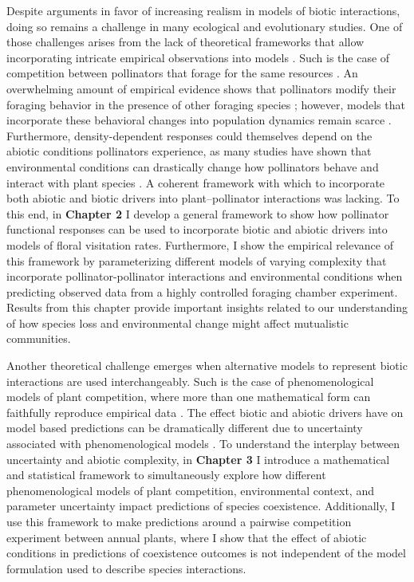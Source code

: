 \documentclass[12pt]{article}
\begin{document}
Despite arguments in favor of increasing realism in models of biotic interactions, doing so remains a challenge in many ecological and evolutionary studies. One of those challenges arises from the lack of theoretical frameworks that allow incorporating intricate empirical observations into models \citep{abrams1983arguments,abrams2001describing}.  Such is the case of competition between pollinators that forage for the same resources \citep{thomson_importance_2020}. An overwhelming amount of empirical evidence shows that pollinators modify their foraging behavior in the presence of other foraging species \citep{morse_resource_1977,inouye_resource_1978,thompson_dynamics_2006,brosi_single_2013,briggs_competitive_2016}; however, models that incorporate these behavioral changes into population dynamics remain scarce \citep{thomson_importance_2020}. Furthermore, density-dependent responses could themselves depend on the abiotic conditions pollinators experience, as many studies have shown that environmental conditions can drastically change how pollinators behave and interact with plant species \citep{heinrich_resource_1976,thomson_response_1987,cnaani_flower_2006,westphal_bumblebees_2006,briggs2018variation,classen2020specialization}. A coherent framework with which to incorporate both abiotic and biotic drivers into plant--pollinator interactions was lacking. To this end, in \textbf{Chapter 2} I develop a general framework to show how pollinator functional responses can be used to incorporate biotic and abiotic drivers into models of floral visitation rates. Furthermore, I show the empirical relevance of this framework by parameterizing different models of varying complexity that incorporate pollinator-pollinator interactions and environmental conditions when predicting observed data from a highly controlled foraging chamber experiment. Results from this chapter provide important insights related to our understanding of how species loss and environmental change might affect mutualistic communities.


Another theoretical challenge emerges when alternative models to represent biotic interactions are used interchangeably. Such is the case of phenomenological models of plant competition, where more than one mathematical form can faithfully reproduce empirical data \citep{levine2009importance,godoy_phenology_2014,godoy_phylogenetic_2014,mayfield2017higher,bimler_accurate_2018}. The effect biotic and abiotic drivers have on model based predictions can be dramatically different due to uncertainty associated with phenomenological models \citep{jorgensen2001fundamentals,flora_structural_2011, aldebert2018community}. To understand the interplay between uncertainty and abiotic complexity, in \textbf{Chapter 3} I introduce a mathematical and statistical framework to simultaneously explore how different phenomenological models of plant competition, environmental context, and parameter uncertainty impact predictions of species coexistence. Additionally, I use this framework to make predictions around a pairwise competition experiment between annual plants, where I show that the effect of abiotic conditions in predictions of coexistence outcomes is not independent of the model formulation used to describe species interactions.
\end{document}
